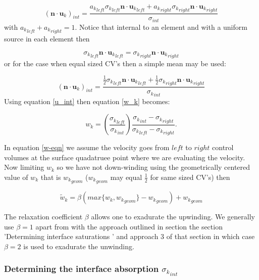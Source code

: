 \begin{equation}
({{\mathbf n}\cdot{\mathbf u}_k})_{int}= \frac{{a_k}_{left} {\sigma_k}_{left} {{\mathbf n}\cdot{\mathbf u}_k}_{left} + {a_k}_{right} {\sigma_k}_{right} {{\mathbf n}\cdot{\mathbf u}_k}_{right}}{\sigma_{int}}
\end{equation}
with ${a_k}_{left}+{a_k}_{right}=1$. 
Notice that internal to an element and with a uniform 
source in each element then  

\begin{equation}
{\sigma_k}_{left} {{\mathbf n}\cdot{\mathbf u}_k}_{left} =  {\sigma_k}_{right} {{\mathbf n}\cdot{\mathbf u}_k}_{right}
\label{u_int} 
\end{equation}
or for the case when equal sized CV's then a simple mean may be used:

\begin{equation}
({{\mathbf n}\cdot{\mathbf u}_k})_{int}= \frac{\frac{1}{2} {\sigma_k}_{left}{{\mathbf n}\cdot{\mathbf u}_k}_{left}  
+ \frac{1}{2}{\sigma_k}_{right} {{\mathbf n}\cdot{\mathbf u}_k}_{right}}{{\sigma_k}_{int}}
\end{equation}
Using equation \ref{u_int} then equation \ref{w_k} becomes:

\begin{equation}
w_k=\left( \frac{{\sigma_k}_{left}}{{\sigma_k}_{int}} \right) 
\frac{ {\sigma_k}_{int} - {\sigma_k}_{right}} 
{ {\sigma_k}_{left} - {\sigma_k}_{right}} 
\label{w-eqn}. 
\end{equation}

In equation \ref{w-eqn} we assume the velocity goes from $left$ to $right$ 
control volumes at the surface quadatruee point 
where we are evaluating the velocity. Now limiting 
$w_k$ so we have not down-winding using the 
geometrically centered value of $w_k$ that is ${w_k}_{geom}$ 
(${w_k}_{geom}$ may equal $\frac{1}{2}$ for same sized CV's) 
then

\begin{equation}
\tilde w_k=\beta (max\{ w_k, {w_k}_{geom} \}-{w_k}_{geom}) + {w_k}_{geom}
\end{equation}

The relaxation coefficient $\beta$ allows one to 
exadurate the upwinding. We generally use $\beta=1$ apart 
from with the approach outlined in section 
the section '{Determining interface saturations  }' 
and approach 3 of that section in which case $\beta=2$ is 
used to exadurate the unwinding.  



\subsubsection{Determining the interface absorption ${\sigma_k}_{int}$ }

